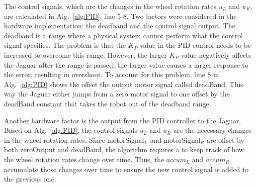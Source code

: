 \documentclass[conference]{../IEEEtran}
\begin{document}
The control signals, which are the changes in the wheel rotation rates $u_L$ and $u_R$,
are calculated in Alg.~\ref{alg:PID}, line 5-8. Two factors were considered in the
hardware implementation: the deadband and the control signal output. The deadband is a
range where a physical system cannot perform what the control signal specifies. The
problem is that the $K_P$ value in the PID control needs to be increased to overcome this
range. However, the larger $K_P$ value negatively affects the Jaguar after the range is
passed; the larger value causes a larger response to the error, resulting in overshoot. To
account for this problem, line 8 in Alg.~\ref{alg:PID} shows the offset the output motor
signal called deadBand. This way the Jaguar either jumps from a zero motor signal to one
offset by the deadBand constant that takes the robot out of the deadband range.

Another hardware factor is the output from the PID controller to the Jaguar. Based on
Alg.~\ref{alg:PID}, the control signals $u_L$ and $u_R$ are the necessary changes in the
wheel rotation rates. Since motorSignal$_{L}$ and motorSignal$_{R}$ are offset by both
zeroOutput and deadBand, the algorithm requires a to keep track of how the wheel rotation
rates change over time. Thus, the $accum_L$ and $accum_R$ accumulate those changes over
time to ensure the new control signal is added to the previous one.
\end{document}
